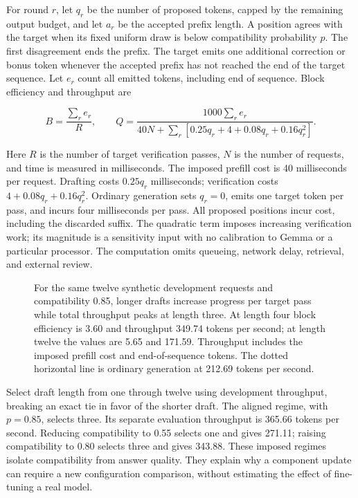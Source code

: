 For round \(r\), let \(q_r\) be the number of proposed tokens, capped by
the remaining output budget, and let \(a_r\) be the accepted prefix
length. A position agrees with the target when its fixed uniform draw is
below compatibility probability \(p\). The first disagreement ends the
prefix. The target emits one additional correction or bonus token
whenever the accepted prefix has not reached the end of the target
sequence. Let \(e_r\) count all emitted tokens, including end of
sequence. Block efficiency and throughput are

\[
B=\frac{\sum_r e_r}{R},\qquad
Q=\frac{1000\sum_r e_r}{40N+\sum_r [0.25q_r+4+0.08q_r+0.16q_r^2]}.
\]

Here \(R\) is the number of target verification passes, \(N\) is the
number of requests, and time is measured in milliseconds. The imposed
prefill cost is 40 milliseconds per request. Drafting costs \(0.25q_r\)
milliseconds; verification costs \(4+0.08q_r+0.16q_r^2\). Ordinary
generation sets \(q_r=0\), emits one target token per pass, and incurs
four milliseconds per pass. All proposed positions incur cost, including
the discarded suffix. The quadratic term imposes increasing verification
work; its magnitude is a sensitivity input with no calibration to Gemma
or a particular processor. The computation omits queueing, network
delay, retrieval, and external review.

\begin{figure}[htbp]
\centering

\caption{For the same twelve synthetic development requests and compatibility 0.85, longer drafts increase progress per target pass while total throughput peaks at length three. At length four block efficiency is 3.60 and throughput 349.74 tokens per second; at length twelve the values are 5.65 and 171.59. Throughput includes the imposed prefill cost and end-of-sequence tokens. The dotted horizontal line is ordinary generation at 212.69 tokens per second.}\label{fig:M07_drafting_cost}
\end{figure}

Select draft length from one through twelve using development
throughput, breaking an exact tie in favor of the shorter draft. The
aligned regime, with \(p=0.85\), selects three. Its separate evaluation
throughput is 365.66 tokens per second. Reducing compatibility to 0.55
selects one and gives 271.11; raising compatibility to 0.80 selects
three and gives 343.88. These imposed regimes isolate compatibility from
answer quality. They explain why a component update can require a new
configuration comparison, without estimating the effect of fine-tuning a
real model.

